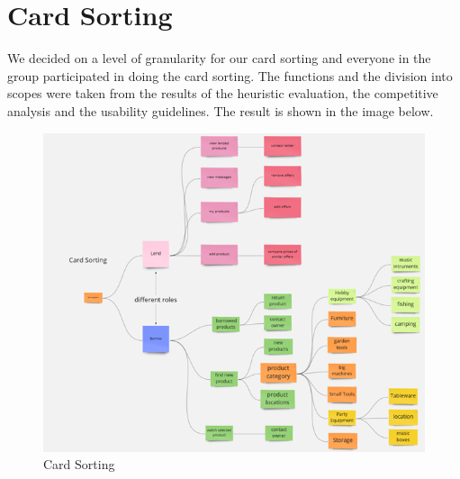 \section{Card Sorting}\label{Card Sorting}

We decided on a level of granularity for our card sorting and everyone in the group participated in doing the card sorting. The functions and the division into scopes were taken from the results of the heuristic evaluation, the competitive analysis and the usability guidelines. The result is shown in the image below.
\begin{figure}[H]
	\centering
	\includegraphics[width=\linewidth]{abb/5_card_sorting/CardSorting.png}
	\caption{Card Sorting}
	\label{fig:card_sorting}
\end{figure}
